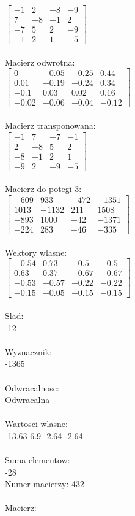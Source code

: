 \documentclass[a4paper,12pt]{article}
\begin{document}
$\begin{bmatrix} -1&2&-8&-9\\7&-8&-1&2\\-7&5&2&-9\\-1&2&1&-5 \end{bmatrix}$
\\
\\
Macierz odwrotna:\\

$\begin{bmatrix} 0&-0.05&-0.25&0.44\\0.01&-0.19&-0.24&0.34\\-0.1&0.03&0.02&0.16\\-0.02&-0.06&-0.04&-0.12 \end{bmatrix}$
\\
\\
Macierz transponowana:\\

$\begin{bmatrix} -1&7&-7&-1\\2&-8&5&2\\-8&-1&2&1\\-9&2&-9&-5 \end{bmatrix}$
\\
\\
Macierz do potegi 3:\\

$\begin{bmatrix} -609&933&-472&-1351\\1013&-1132&211&1508\\-893&1000&-42&-1371\\-224&283&-46&-335 \end{bmatrix}$
\\
\\
Wektory wlasne:\\

$\begin{bmatrix} -0.54&0.73&-0.5&-0.5\\0.63&0.37&-0.67&-0.67\\-0.53&-0.57&-0.22&-0.22\\-0.15&-0.05&-0.15&-0.15 \end{bmatrix}$
\\
\\
Slad:\\
-12
\\
\\
Wyznacznik:\\
-1365
\\
\\
Odwracalnosc:\\
Odwracalna
\\
\\
Wartosci wlasne:\\
-13.63 6.9 -2.64 -2.64
\\
\\
Suma elementow:\\
-28
\\
\newpage
Numer macierzy:
432
\\
\\
Macierz:\\
\end{document}

